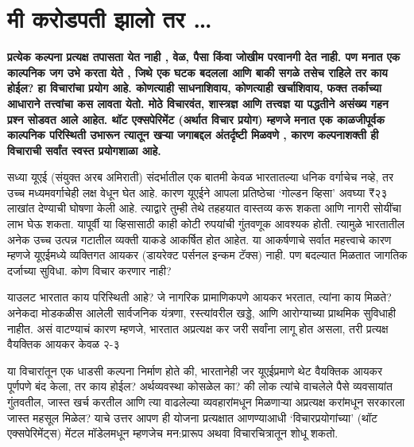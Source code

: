 \chapter{मी करोडपती झालो तर … }

\textcolor{blue!60!black}{\textbf{प्रत्येक कल्पना प्रत्यक्ष तपासता येत नाही , वेळ, पैसा किंवा जोखीम परवानगी देत नाही. पण मनात एक काल्पनिक जग उभे करता येते , जिथे एक घटक बदलला आणि बाकी सगळे तसेच राहिले तर काय होईल? हा विचारांचा प्रयोग आहे. कोणत्याही साधनाशिवाय, कोणत्याही खर्चाशिवाय, फक्त तर्काच्या आधाराने तत्त्वांचा कस लावता येतो. मोठे विचारवंत, शास्त्रज्ञ आणि तत्त्वज्ञ या पद्धतीने असंख्य गहन प्रश्न सोडवत आले आहेत. थॉट एक्सपेरिमेंट (अर्थात विचार प्रयोग) म्हणजे मनात एक काळजीपूर्वक काल्पनिक परिस्थिती उभारून त्यातून खऱ्या जगाबद्दल अंतर्दृष्टी मिळवणे , कारण कल्पनाशक्ती ही विचाराची सर्वांत स्वस्त प्रयोगशाळा आहे.}}

सध्या यूएई (संयुक्त अरब अमिराती) संदर्भातील एक बातमी केवळ भारतातल्या धनिक वर्गाचेच नव्हे, तर उच्च मध्यमवर्गाचेही लक्ष वेधून घेत आहे. कारण यूएईने आपला प्रतिष्ठेचा ‘गोल्डन व्हिसा’ अवघ्या ₹२३ लाखांत देण्याची घोषणा केली आहे. त्याद्वारे तुम्ही तेथे तहहयात वास्तव्य करू शकता आणि नागरी सोयींचा लाभ घेऊ शकता. यापूर्वी या व्हिसासाठी काही कोटी रुपयांची गुंतवणूक आवश्यक होती. त्यामुळे भारतातील अनेक उच्च उत्पन्न गटातील व्यक्ती याकडे आकर्षित होत आहेत. या आकर्षणाचे सर्वात महत्त्वाचे कारण म्हणजे यूएईमध्ये व्यक्तिगत आयकर (डायरेक्ट पर्सनल इन्कम टॅक्स) नाही. पण बदल्यात मिळतात जागतिक दर्जाच्या सुविधा. कोण विचार करणार नाही?

याउलट भारतात काय परिस्थिती आहे? जे नागरिक प्रामाणिकपणे आयकर भरतात, त्यांना काय मिळते? अनेकदा मोडकळीस आलेली सार्वजनिक यंत्रणा, रस्त्यांवरील खड्डे, आणि आरोग्याच्या प्राथमिक सुविधाही नाहीत. असं वाटण्याचं कारण म्हणजे, भारतात अप्रत्यक्ष कर जरी सर्वांना लागू होत असला, तरी प्रत्यक्ष वैयक्तिक आयकर केवळ २-३%

या विचारांतून एक धाडसी कल्पना निर्माण होते की, भारतानेही जर यूएईप्रमाणे थेट वैयक्तिक आयकर पूर्णपणे बंद केला, तर काय होईल? अर्थव्यवस्था कोसळेल का? की लोक त्यांचे वाचलेले पैसे व्यवसायांत गुंतवतील, जास्त खर्च करतील आणि त्या वाढलेल्या व्यवहारांमधून मिळणाऱ्या अप्रत्यक्ष करांमधून सरकारला जास्त महसूल मिळेल? याचे उत्तर आपण ही योजना प्रत्यक्षात आणण्याआधी ‘विचारप्रयोगांच्या’ (थॉट एक्सपेरिमेंट्स) मेंटल मॉडेलमधून म्हणजेच मन:प्रारूप अथवा विचारचित्रातून  शोधू शकतो.

